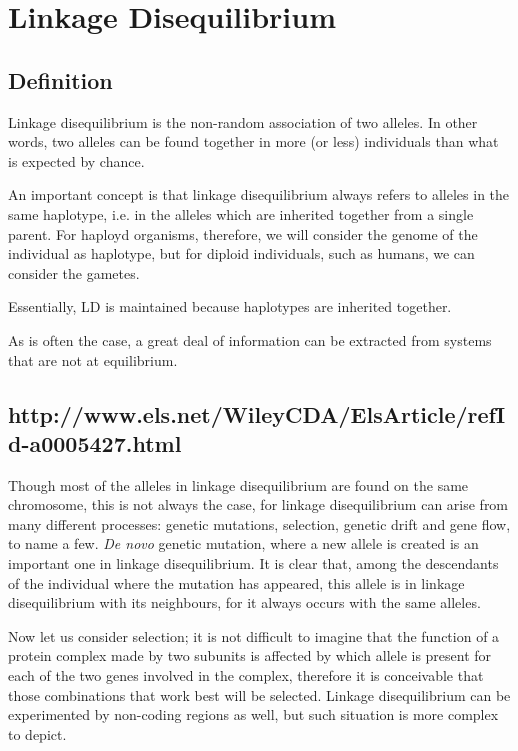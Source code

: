 \documentclass[../main.tex]{subfiles}
\begin{document}
\chapter{Linkage Disequilibrium}


\section{Definition}

Linkage disequilibrium is the non-random association of two alleles. In
other words, two alleles can be found together in more (or less)
individuals than what is expected by chance.

An important concept is that linkage disequilibrium always refers to
alleles in the same haplotype, i.e. in the alleles which are inherited
together from a single parent. For haployd organisms, therefore,
we will consider the genome of the individual as haplotype, but for
diploid individuals, such as humans, we can consider the gametes.

Essentially, LD is maintained because haplotypes are inherited together.

As is often the case, a great deal of information can be extracted from 
systems that are not at equilibrium.



\section{http://www.els.net/WileyCDA/ElsArticle/refId-a0005427.html}

Though most of the alleles in linkage disequilibrium are found on the 
same chromosome, this is not always the case, for linkage disequilibrium 
can arise from many different processes: genetic mutations, selection, 
genetic drift and gene flow, to name a few. \textit{De novo} genetic 
mutation, where a new allele is created is an important one in linkage 
disequilibrium. It is clear that, among the descendants of the 
individual where the mutation has appeared, this allele is in linkage 
disequilibrium with its neighbours, for it always occurs with the same 
alleles.

Now let us consider selection; it is not difficult to imagine that the 
function of a protein complex made by two subunits is affected by which 
allele is present for each of the two genes involved in the complex, 
therefore it is conceivable that those combinations that work best will 
be selected. Linkage disequilibrium can be experimented by non-coding 
regions as well, but such situation is more complex to depict.
\end{document}

